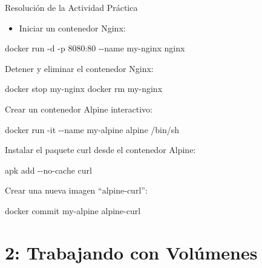 \documentclass[
  a4paper,
  DIV=11,
  numbers=noendperiod,
  onepage,
  openany]{scrreprt}
\newenvironment{Shaded}{\begin{snugshade}}{\end{snugshade}}
\newcommand{\AttributeTok}[1]{\textcolor[rgb]{0.40,0.45,0.13}{#1}}
\newcommand{\ExtensionTok}[1]{\textcolor[rgb]{0.00,0.23,0.31}{#1}}
\newcommand{\NormalTok}[1]{\textcolor[rgb]{0.00,0.23,0.31}{#1}}
\providecommand{\tightlist}{%
  \setlength{\itemsep}{0pt}\setlength{\parskip}{0pt}}\usepackage{longtable,booktabs,array}
\begin{document}
Resolución de la Actividad Práctica

\begin{itemize}
\tightlist
\item
  Iniciar un contenedor Nginx:
\end{itemize}

\begin{Shaded}
\begin{Highlighting}[]
\ExtensionTok{docker}\NormalTok{ run }\AttributeTok{{-}d} \AttributeTok{{-}p}\NormalTok{ 8080:80 }\AttributeTok{{-}{-}name}\NormalTok{ my{-}nginx nginx}
\end{Highlighting}
\end{Shaded}

Detener y eliminar el contenedor Nginx:

\begin{Shaded}
\begin{Highlighting}[]
\ExtensionTok{docker}\NormalTok{ stop my{-}nginx}
\ExtensionTok{docker}\NormalTok{ rm my{-}nginx}
\end{Highlighting}
\end{Shaded}

Crear un contenedor Alpine interactivo:

\begin{Shaded}
\begin{Highlighting}[]
\ExtensionTok{docker}\NormalTok{ run }\AttributeTok{{-}it} \AttributeTok{{-}{-}name}\NormalTok{ my{-}alpine alpine /bin/sh}
\end{Highlighting}
\end{Shaded}

Instalar el paquete curl desde el contenedor Alpine:

\begin{Shaded}
\begin{Highlighting}[]
\ExtensionTok{apk}\NormalTok{ add }\AttributeTok{{-}{-}no{-}cache}\NormalTok{ curl}
\end{Highlighting}
\end{Shaded}

Crear una nueva imagen ``alpine-curl'':

\begin{Shaded}
\begin{Highlighting}[]
\ExtensionTok{docker}\NormalTok{ commit my{-}alpine alpine{-}curl}
\end{Highlighting}
\end{Shaded}

\hypertarget{trabajando-con-voluxfamenes}{%
\chapter{2: Trabajando con
Volúmenes}\label{trabajando-con-voluxfamenes}}
\end{document}
